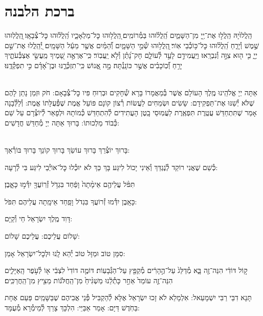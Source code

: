 \documentclass[twoside, openany, parskip=half, 11pt]{book}
\begin{document}
\section[ברכת הלבנה]{ ברכת הלבנה }

הַֽלֲלוּ֙יָהּ הַֽלֲל֣וּ אֶת־יְ֖יָ מִן־הַשָּׁמַ֑יִם הַֽ֝לֲל֗וּהוּ בַּמְּ֯רוֹמִֽים׃
֭הַֽלֲל֥וּהוּ כׇּל־מַלְאָכָ֑יו הַֽ֝לֲל֗וּהוּ כׇּל־צְ֯בָאָֽו׃
֖הַֽלֲלֽוּהוּ שֶׁ֣מֶשׁ וְ֯יָרֵ֑חַ הַֽ֝לֲל֗וּהוּ כׇּל־כּ֥וֹכְ֯בֵי אֽוֹר׃
֖הַֽלֲל֥וּהוּ שְׁ֯מֵ֣י הַשָּׁמָ֑יִם וְ֝֯הַמַּ֗יִם אֲשֶׁ֤ר מֵעַ֬ל הַשָּׁמָֽיִם׃
יְ֭֯הַֽלֲלוּ אֶת־שֵׁ֣ם יְיָ֑ כִּ֤י ה֖וּא צִוָּ֣ה וְ֯נִבְרָֽאוּ׃
וַיַּֽעֲמִידֵ֣ם לָעַ֣ד לְ֯עוֹלָ֑ם חָק־נָ֝תַ֗ן וְ֯לֹ֣א יַֽעֲבֽוֹר׃
כִּֽי־אֶרְאֶ֣ה שָׁ֭מֶיךָ מַֽעֲשֵׂ֣י אֶצְבְּ֯עֹתֶ֑יךָ יָרֵ֥חַ וְ֝֯כֽוֹכָבִ֗ים אֲשֶׁ֣ר כּוֹנָֽנְ֯תָּה׃
מָ֣ה אֱ֭נוֹשׁ כִּֽי־תִזְכְּ֯רֶ֑נּוּ וּבֶן־אָ֝דָ֗ם כִּ֣י תִפְקְ֯דֶֽנּוּ׃

\\
אַתָּה יְיָ אֱלֹהֵֽינוּ מֶֽלֶךְ הָעוֹלָם אֲשֶׁר בְּ֯מַאֲמָרוֹ בָּרָא שְׁ֯חָקִים וּבְרֽוּחַ פִּיו כׇּל־צְ֯בָאָם: חֹק וּזְמַן נָתַן לָהֶם שֶׁלֹּא יְ֯שַׁנּוּ אֶת־תַּפְקִידָם: שָׂשִׂים וּשְׂמֵחִים לַעֲשׂוֹת רְ֯צוֹן קוֹנָם פּוֹעֵל אֱמֶת שֶׁפְּ֯עֻלָּתוֹ אֱמֶת: וְ֯לַלְּ֯בָנָה אָמַר שֶׁתִּתְחַדֵּשׁ עֲטֶֽרֶת תִּפְאֶֽרֶת לַעֲמֽוּסֵי בָֽטֶן הָעֲתִידִים לְ֯הִתְחַדֵּשׁ כְּ֯מוֹתָהּ וּלְפָאֵר לְ֯יוֹצְ֯רָם עַל שֵׁם כְּ֯בוֹד מַלְכוּתוֹ: בָּרוּךְ אַתָּה יְיָ מְ֯חַדֵּשׁ חֳדָשִׁים:

\\
בָּרוּךְ יוֹצְ֯רֵךְ בָּרוּךְ עוֹשֵׂךְ בָּרוּךְ קוֹנֵךְ בָּרוּךְ בּוֹרְ֯אֵךְ:

כְּ֯שֵׁם שֶׁאֲנִי רוֹקֵד לְ֯נֶגְדֵּךְ וְ֯אֵינִי יָכוֹל לִיגַּע בָּךְ
כַּךְ לֹא יוּכְ֯לוּ כׇּל־אוֹיְ֯בַי לִיגַּע בִּי לְ֯רָעָה:

תִּפֹּ֨ל עֲלֵיהֶ֤ם אֵימָ֨תָה֙ וָפַ֔חַד בִּגְדֹ֥ל זְ֯רֽוֹעֲךָ֖ יִדְּ֯מ֣וּ כָּאָ֑בֶן׃


כָּאָֽבֶן יִדְּ֯מוּ זְ֯רוֹעֲךָ בִּגְדֹל וָפַֽחַד אֵימָֽתָה עֲלֵיהֶם תִּפֹּל:


דָּוִד מֶֽלֶךְ יִשְׂרָאֵל חַי וְ֯קַיָּם:

שָׁלוֹם עֲלֵיכֶם: \qquad {}
עֲלֵיכֶם שָׁלוֹם:


סִמָּן טוֹב וּמַזָּל טוֹב יְ֯הֵא לָֽנוּ וּלְכׇל־יִשְׂרָאֵל אָמֵן:

ק֣וֹל דּוֹדִ֔י הִנֵּה־זֶ֖ה בָּ֑א מְ֯דַלֵּג֙ עַל־הֶ֣הָרִ֔ים מְ֯קַפֵּ֖ץ עַל־הַגְּ֯בָעֽוֹת׃ דּוֹמֶ֤ה דוֹדִי֙ לִצְבִ֔י א֖וֹ לְ֯עֹ֣פֶר הָֽאַיָּלִ֑ים הִנֵּה־זֶ֤ה עוֹמֵד֙ אַחַ֣ר כָּתְ֯לֵ֔נוּ מַשְׁגִּ֨יחַ֙ מִן־הַֽחֲלֹּנ֔וֹת מֵצִ֖יץ מִן־הַֽחֲרַכִּֽים׃

תָּנָא דִבֵּי רַבִּי יִשְׁמָעֵאל: אִלְמָלֵא לֹא זָכוּ יִשְׂרָאֵל אֶלָּא לְ֯הַקְבִּיל פְּ֯נֵי אֲבִיהֶם שֶׁבַּשָּׁמַֽיִם פַּעַם אֶחָת בַּחֹֽדֶשׁ דַּיָּם: אָמַר אַבַּיֵּי: הִלְכָּךְ צָרֵךְ לְ֯מֵימְ֯רָא מְ֯עֻמָּד:
\end{document}
